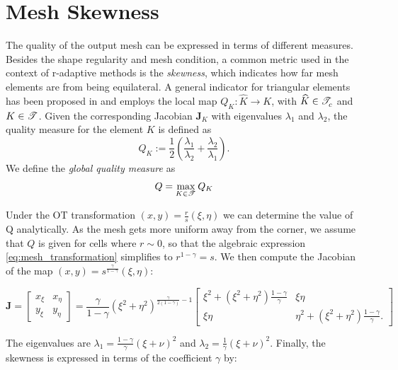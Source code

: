 \documentclass[a4paper,11pt]{article}
\begin{document}
{\section{Mesh Skewness}
\label{sec:skewness}
The quality of the output mesh can be expressed in terms of different measures. Besides the shape regularity and mesh condition, a common metric used in the context of r-adaptive methods is the \textit{skewness}, which indicates how far mesh elements are from being equilateral. A general indicator for triangular elements has been proposed in \cite{BHR:2009} and employs the local map $Q_{K}: \widehat{K}
\rightarrow K$, with $\widehat{K} \in \mathscr T^{}_{c}$ and $K \in
\mathscr T^{}$. Given the corresponding Jacobian $\pmb{J}_{K}$ with eigenvalues
$\lambda_{1}$ and $\lambda_{2}$, the quality measure for the element
$K$ is defined as
\begin{equation}
  Q_{K}
  :=
  \frac{1}{2} \left( \frac{\lambda_{1}}{\lambda_{2}}
  +
  \frac{\lambda_{2}}{\lambda_{1}}  \right).
  \label{eq:local skewness}
\end{equation}
We define the \emph{global quality measure} as
\begin{equation}
  Q = \max_{K \in \mathscr T^{}}
  Q_{K}
\end{equation}

Under the OT transformation $(x,y) = \frac{r}{s} (\xi,\eta)$ we can determine the value of Q analytically. As the mesh gets more uniform away from the corner, we assume that $Q$ is given for cells where $r \sim 0$, so that the algebraic expression \eqref{eq:mesh_transformation} simplifies to $r^{1-\gamma} = s$. We then compute the Jacobian of the map $(x,y) = s^{\frac{\gamma}{1-\gamma}} (\xi,\eta)$:


\begin{equation*} 
 \pmb{J} =  \begin{bmatrix}
x_{\xi} & x_{\eta} \\
y_{\xi} & y_{\eta}  
\end{bmatrix} =  
\frac{\gamma}{1-\gamma} (\xi^{2} + \eta^{2})^{\frac{\gamma}{2(1-\gamma)}-1} \begin{bmatrix}
 \xi^{2} + (\xi^{2} + \eta^{2})\frac{1-\gamma}{\gamma} &  \xi \eta  \\
 \xi \eta &  \eta^{2} + (\xi^{2} + \eta^{2})\frac{1-\gamma}{\gamma}.    
\end{bmatrix}
\end{equation*}

The eigenvalues are $\lambda_{1} = \frac{1-\gamma}{\gamma}(\xi + \nu)^{2}$ and $\lambda_{2} = \frac{1}{\gamma}(\xi + \nu)^{2}$. Finally, the skewness is expressed in terms of the coefficient $\gamma$ by:

}
\end{document}
